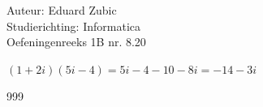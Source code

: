 \documentclass[a4paper]{article}
\begin{document}
  
\noindent \large Auteur: Eduard Zubic \\
\noindent \large Studierichting: Informatica\\
\noindent \large Oefeningenreeks 1B nr. 8.20\\

\medskip

\normalsize

$(1 + 2i)(5i - 4) = 5i - 4 - 10 - 8i = -14 - 3i$

\begin{thebibliography}{999}
\end{thebibliography}
\end{document}
